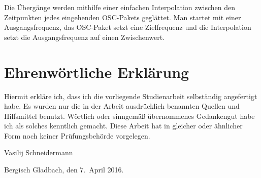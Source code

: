 \documentclass[a4paper, fontsize=12pt, toc=bibliographynumbered]{scrreprt}
\begin{document}
Die Übergänge werden mithilfe einer einfachen Interpolation zwischen
den Zeitpunkten jedes eingehenden OSC-Pakets geglättet.  Man startet
mit einer Ausgangsfrequenz, das OSC-Paket setzt eine Zielfrequenz und
die Interpolation setzt die Ausgangsfrequenz auf einen Zwischenwert.

\chapter{Ehrenwörtliche Erklärung}

Hiermit erkläre ich, dass ich die vorliegende Studienarbeit
selbständig angefertigt habe.  Es wurden nur die in der Arbeit
ausdrücklich benannten Quellen und Hilfsmittel benutzt.  Wörtlich oder
sinngemäß übernommenes Gedankengut habe ich als solches kenntlich
gemacht. Diese Arbeit hat in gleicher oder ähnlicher Form noch keiner
Prüfungsbehörde vorgelegen.

Vasilij Schneidermann

Bergisch Gladbach, den 7.~April 2016.
\end{document}
